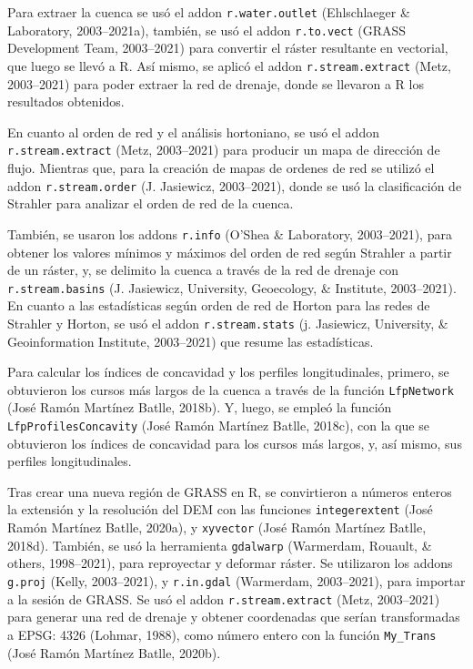 \documentclass[11pt,]{article}
\begin{document}
Para extraer la cuenca se usó el addon \texttt{r.water.outlet}
(Ehlschlaeger \& Laboratory, 2003--2021a), también, se usó el addon
\texttt{r.to.vect} (GRASS Development Team, 2003--2021) para convertir
el ráster resultante en vectorial, que luego se llevó a R. Así mismo, se
aplicó el addon \texttt{r.stream.extract} (Metz, 2003--2021) para poder
extraer la red de drenaje, donde se llevaron a R los resultados
obtenidos.

En cuanto al orden de red y el análisis hortoniano, se usó el addon
\texttt{r.stream.extract} (Metz, 2003--2021) para producir un mapa de
dirección de flujo. Mientras que, para la creación de mapas de ordenes
de red se utilizó el addon \texttt{r.stream.order} (J. Jasiewicz,
2003--2021), donde se usó la clasificación de Strahler para analizar el
orden de red de la cuenca.

También, se usaron los addons \texttt{r.info} (O'Shea \& Laboratory,
2003--2021), para obtener los valores mínimos y máximos del orden de red
según Strahler a partir de un ráster, y, se delimito la cuenca a través
de la red de drenaje con \texttt{r.stream.basins} (J. Jasiewicz,
University, Geoecology, \& Institute, 2003--2021). En cuanto a las
estadísticas según orden de red de Horton para las redes de Strahler y
Horton, se usó el addon \texttt{r.stream.stats} (j. Jasiewicz,
University, \& Geoinformation Institute, 2003--2021) que resume las
estadísticas.

Para calcular los índices de concavidad y los perfiles longitudinales,
primero, se obtuvieron los cursos más largos de la cuenca a través de la
función \texttt{LfpNetwork} (José Ramón Martínez Batlle, 2018b). Y,
luego, se empleó la función \texttt{LfpProfilesConcavity} (José Ramón
Martínez Batlle, 2018c), con la que se obtuvieron los índices de
concavidad para los cursos más largos, y, así mismo, sus perfiles
longitudinales.

Tras crear una nueva región de GRASS en R, se convirtieron a números
enteros la extensión y la resolución del DEM con las funciones
\texttt{integerextent} (José Ramón Martínez Batlle, 2020a), y
\texttt{xyvector} (José Ramón Martínez Batlle, 2018d). También, se usó
la herramienta \texttt{gdalwarp} (Warmerdam, Rouault, \& others,
1998--2021), para reproyectar y deformar ráster. Se utilizaron los
addons \texttt{g.proj} (Kelly, 2003--2021), y \texttt{r.in.gdal}
(Warmerdam, 2003--2021), para importar a la sesión de GRASS. Se usó el
addon \texttt{r.stream.extract} (Metz, 2003--2021) para generar una red
de drenaje y obtener coordenadas que serían transformadas a EPSG: 4326
(Lohmar, 1988), como número entero con la función \texttt{My\_Trans}
(José Ramón Martínez Batlle, 2020b).
\end{document}
